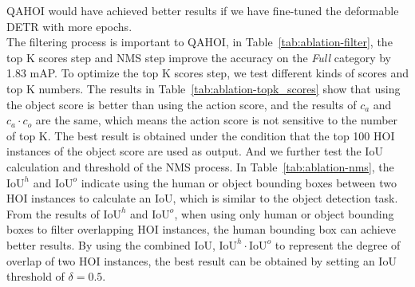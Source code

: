 \documentclass[10pt,twocolumn,letterpaper]{article}
\begin{document}
QAHOI would have achieved better results if we have fine-tuned the deformable DETR with more epochs.
\\
\space The filtering process is important to QAHOI, in Table~\ref{tab:ablation-filter}, the top K scores step and NMS step improve the accuracy on the {\em Full} category by 1.83 mAP.
To optimize the top K scores step, we test different kinds of scores and top K numbers. 
The results in Table~\ref{tab:ablation-topk_scores} show that using the object score is better than using the action score, and the results of $c_{a}$ and $c_{a}\cdot c_{o}$ are the same, which means the action score is not sensitive to the number of top K.
The best result is obtained under the condition that the top 100 HOI instances of the object score are used as output.
And we further test the IoU calculation and threshold of the NMS process. 
In Table~\ref{tab:ablation-nms}, the $\text{IoU}^{h}$ and $\text{IoU}^{o}$ indicate using the human or object bounding boxes between two HOI instances to calculate an IoU, which is similar to the object detection task. 
From the results of $\text{IoU}^{h}$ and $\text{IoU}^{o}$, when using only human or object bounding boxes to filter overlapping HOI instances, the human bounding box can achieve better results.
By using the combined IoU, $\text{IoU}^{h}\cdot \text{IoU}^{o}$ to represent the degree of overlap of two HOI instances, 
the best result can be obtained by setting an IoU threshold of $\delta=0.5$.
\end{document}
